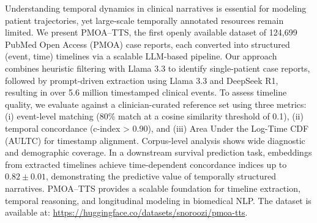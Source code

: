 \vspace{-.5em}
Understanding temporal dynamics in clinical narratives is essential for modeling patient trajectories, yet large-scale temporally annotated resources remain limited. We present PMOA–TTS, the first openly available dataset of 124,699 PubMed Open Access (PMOA) case reports, each converted into structured (event, time) timelines via a scalable LLM-based pipeline. Our approach combines heuristic filtering with Llama 3.3 to identify single-patient case reports, followed by prompt-driven extraction using Llama 3.3 and DeepSeek R1, resulting in over 5.6 million timestamped clinical events. To assess timeline quality, we evaluate against a clinician-curated reference set using three metrics: (i) event-level matching (80\% match at a cosine similarity threshold of 0.1), (ii) temporal concordance (c-index > 0.90), and (iii) Area Under the Log-Time CDF (AULTC) for timestamp alignment. Corpus-level analysis shows wide diagnostic and demographic coverage. In a downstream survival prediction task, embeddings from extracted timelines achieve time-dependent concordance indices up to \(0.82 \pm 0.01\), demonstrating the predictive value of temporally structured narratives. PMOA–TTS provides a scalable foundation for timeline extraction, temporal reasoning, and longitudinal modeling in biomedical NLP. The dataset is available at: \url{https://huggingface.co/datasets/snoroozi/pmoa-tts}.\vspace{-.5em}


